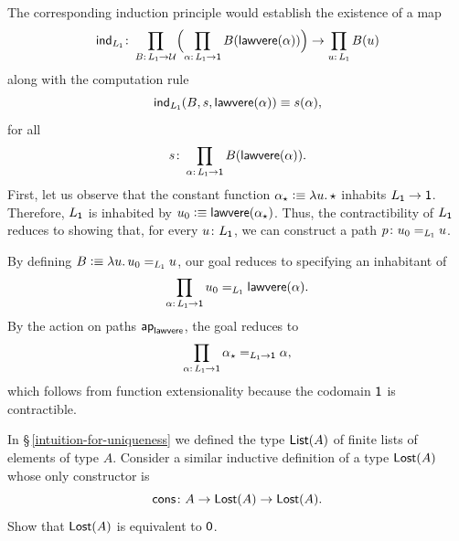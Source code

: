 \begin{solution}
    The corresponding induction principle would establish the existence of a map
    \[
        \fun{ind}_{L_{\fun1}}\colon
            \prod_{B\colon L_{\fun1}\to\univ}
                \Bigl(
                    \prod_{
                        \alpha\colon L_{\fun1}\to\fun1
                        }B(\fun{lawvere}(\alpha))
                \Bigr)
                \to\prod_{u\colon L_{\fun1}}B(u)
    \]
    along with the computation rule
    \[
        \mathsf{ind}_{L_{\mathsf{1}}}(B,s,\mathsf{lawvere}(\alpha))
            \equiv s(\alpha),
    \]
    for all
    \[
        s\colon\prod_{\alpha\colon L_{\fun1}\to\fun1}
            B(\fun{lawvere}(\alpha)).
    \]
    First, let us observe that the constant function $\alpha_{\mathsf{\star}}\mathrel{\vcentcolon}\equiv\lambda u.\,{\mathsf{\star}}$ inhabits $L_{\mathsf{1}}\to\mathsf{1}$. Therefore, $L_{\mathsf{1}}$ is inhabited by $u_0\mathrel{\vcentcolon}\equiv\mathsf{lawvere}(\alpha_{\mathsf{\star}})$. Thus, the contractibility of $L_{\mathsf{1}}$ reduces to showing that, for every $u\colon L_{\fun1}$, we can construct a path $p\colon u_0\eq{L_{\fun1}}u$.

    By defining $B\mathrel{\vcentcolon}\equiv\lambda u.\,u_0\mathrel{=_{L_{\mathsf{1}}}}u$, our goal reduces to specifying an inhabitant of
    \[
        \prod_{\alpha\colon
            L_{\fun1}\to\fun1}u_0
            \eq{L_{\fun1}}
            \fun{lawvere}(\alpha).
    \]
    By the action on paths $\mathsf{ap}_{\mathsf{lawvere}}$, the goal reduces to
    \[
        \prod_{\alpha\colon L_{\fun1}\to\fun1}
            \alpha_\fstar
            \eq{L_{\fun1}\to\fun1}
            \alpha,
    \]
    which follows from function extensionality because the codomain $\mathsf{1}$ is contractible.
\end{solution}

\begin{exr}\label{exr:Lost}
    In\/ {\upshape\S\,\ref{intuition-for-uniqueness}} we defined the type\/ $\mathsf{List}(A)$ of finite lists of elements of type\/ $A$. Consider a similar inductive definition of a type\/ $\mathsf{Lost}(A)$ whose only constructor is
    \[
        \fun{cons}\colon A
            \to\fun{Lost}(A)
            \to\fun{Lost}(A).
    \]
    Show that\/ $\mathsf{Lost}(A)$ is equivalent to\/ $\mathsf{0}$.
\end{exr}

